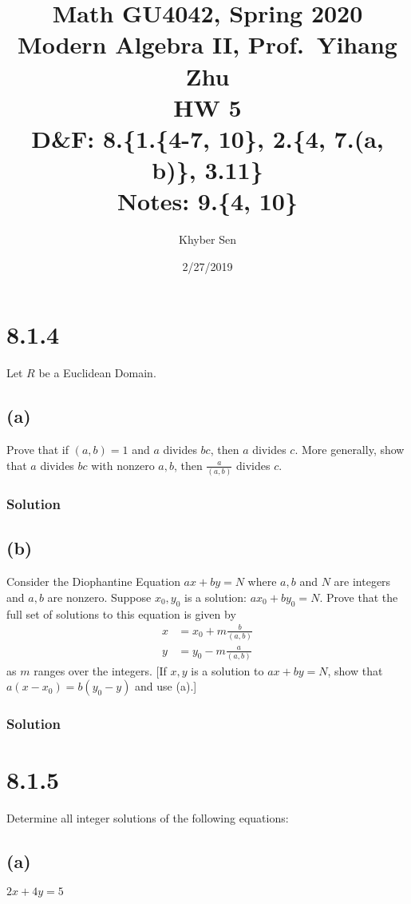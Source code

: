 \documentclass[fleqn]{article}
\title{
Math GU4042, Spring 2020 \\
Modern Algebra II, Prof.\ Yihang Zhu \\
HW 5 \\
D\&F: 8.\{1.\{4-7, 10\}, 2.\{4, 7.(a, b)\}, 3.11\} \\
Notes: 9.\{4, 10\} \\
}
\author{Khyber Sen}
\date{2/27/2019}
\begin{document}
    
    \maketitle
    
    \section{8.1.4}
    Let $R$ be a Euclidean Domain.
        
        \subsection{(a)}
        Prove that if $(a, b) = 1$ and $a$ divides $bc$, then $a$ divides $c$.  More generally, show that $a$ divides $bc$ with nonzero $a, b$, then $\frac{a}{(a, b)}$ divides $c$.
            
            \subsubsection{Solution}
            
        
        \subsection{(b)}
        Consider the Diophantine Equation $ax + by = N$ where $a, b$ and $N$ are integers and $a, b$ are nonzero.  Suppose $x_0, y_0$ is a solution: $ax_0 + by_0 = N$.  Prove that the full set of solutions to this equation is given by
        \begin{align}
            x &= x_0 + m \frac{b}{(a, b)} \\
            y &= y_0 - m \frac{a}{(a, b)}
        \end{align}
        as $m$ ranges over the integers.  [If $x, y$ is a solution to $ax + by = N$, show that $a(x - x_0) = b(y_0 - y)$ and use (a).]
        
            \subsubsection{Solution}
            
    
    \section{8.1.5}
    Determine all integer solutions of the following equations:
        
        \subsection{(a)}
        $2x + 4y = 5$
            
\end{document}
